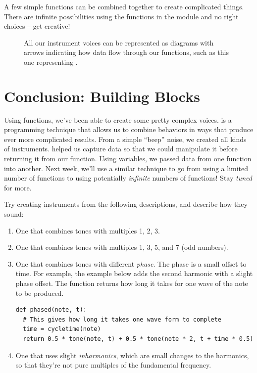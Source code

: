 \begin{BigIdeaBox}
A few simple functions can be combined together to create complicated things. There are infinite
possibilities using the functions in the  module and no right choices -- get creative!
\end{BigIdeaBox}

\begin{figure}[b]
\fixfigure
\label{fig:instrument-hierarchy}
\caption{All our instrument voices can be represented as diagrams with arrows indicating how data flow through our functions, such as this one representing .}
\centering
\scalebox{0.6}{
}
\end{figure}

\section{Conclusion: Building Blocks}

Using functions, we've been able to create some pretty complex voices.  is a
programming technique that allows us to combine behaviors in ways that produce ever more complicated
results. From a simple ``beep'' noise, we created all kinds of instruments.   helped us capture
data so that we could manipulate it before returning it from our function. Using variables, we
passed data from one function into another. Next week, we'll use a similar technique to go from
using a limited number of functions to using potentially \emph{infinite} numbers of functions! Stay
\emph{tuned} for more.

\Exercises

\begin{exercises}
\item Try creating instruments from the following descriptions, and describe how they sound:
  \begin{enumerate}
  \item One that combines tones with multiples 1, 2, 3.
  \item One that combines tones with multiples 1, 3, 5, and 7 (odd numbers).
  \item One that combines tones with different \emph{phase}. The phase is a small offset to
    time. For example, the example below adds the second harmonic with a slight phase offset. The
     function returns how long it takes for one wave of the note to be produced.
    \begin{lstlisting}
def phased(note, t):
  # This gives how long it takes one wave form to complete
  time = cycletime(note)
  return 0.5 * tone(note, t) + 0.5 * tone(note * 2, t + time * 0.5)
    \end{lstlisting}
  \item One that uses slight \emph{inharmonics}, which are small changes to the harmonics, so that
    they're not pure multiples of the fundamental frequency.
  \end{enumerate}
\end{exercises}
